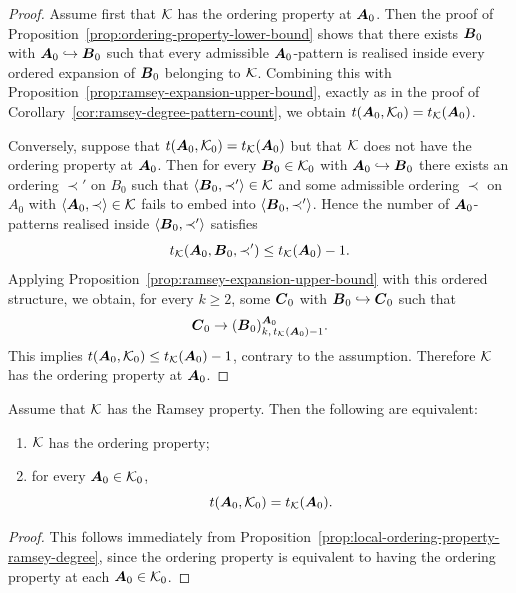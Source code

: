 \begin{proof}
    Assume first that \(\mathcal{K}\) has the ordering property at \(\boldsymbol{A}_0\). Then the proof of Proposition~\ref{prop:ordering-property-lower-bound} shows that there exists \(\boldsymbol{B}_0\) with \(\boldsymbol{A}_0\hookrightarrow\boldsymbol{B}_0\) such that every admissible \(\boldsymbol{A}_0\)-pattern is realised inside every ordered expansion of \(\boldsymbol{B}_0\) belonging to \(\mathcal{K}\). Combining this with Proposition~\ref{prop:ramsey-expansion-upper-bound}, exactly as in the proof of Corollary~\ref{cor:ramsey-degree-pattern-count}, we obtain \(t(\boldsymbol{A}_0,\mathcal{K}_0)=t_{\mathcal{K}}(\boldsymbol{A}_0)\).

    Conversely, suppose that \(t(\boldsymbol{A}_0,\mathcal{K}_0)=t_{\mathcal{K}}(\boldsymbol{A}_0)\)
    but that \(\mathcal{K}\) does not have the ordering property at \(\boldsymbol{A}_0\). Then for every \(\boldsymbol{B}_0\in\mathcal{K}_0\) with \(\boldsymbol{A}_0\hookrightarrow\boldsymbol{B}_0\) there exists an ordering \(\prec'\) on \(B_0\) such that \(\langle\boldsymbol{B}_0,\prec'\rangle\in\mathcal{K}\) and some admissible ordering \(\prec\) on \(A_0\) with \(\langle\boldsymbol{A}_0,\prec\rangle\in\mathcal{K}\)
    fails to embed into \(\langle\boldsymbol{B}_0,\prec'\rangle\). Hence the number of \(\boldsymbol{A}_0\)-patterns realised inside \(\langle\boldsymbol{B}_0,\prec'\rangle\) satisfies
    \[
        t_{\mathcal{K}}(\boldsymbol{A}_0,\boldsymbol{B}_0,\prec')\leq t_{\mathcal{K}}(\boldsymbol{A}_0)-1.
    \]
    Applying Proposition~\ref{prop:ramsey-expansion-upper-bound} with this ordered structure, we obtain, for every \(k\geq 2\), some \(\boldsymbol{C}_0\) with \(\boldsymbol{B}_0\hookrightarrow\boldsymbol{C}_0\) such that
    \[
        \boldsymbol{C}_0\to(\boldsymbol{B}_0)^{\boldsymbol{A}_0}_{k,\,t_{\mathcal{K}}(\boldsymbol{A}_0)-1}.
    \]
    This implies \(t(\boldsymbol{A}_0,\mathcal{K}_0)\leq t_{\mathcal{K}}(\boldsymbol{A}_0)-1\),
    contrary to the assumption. Therefore \(\mathcal{K}\) has the ordering property at \(\boldsymbol{A}_0\).
\end{proof}

\begin{corollary}
    \label{cor:ordering-property-ramsey-degree}
    Assume that \(\mathcal{K}\) has the Ramsey property. Then the following are equivalent:

    \begin{enumerate}
        \item[(i)] \(\mathcal{K}\) has the ordering property;
        \item[(ii)] for every \(\boldsymbol{A}_0\in\mathcal{K}_0\),
              \[
                  t(\boldsymbol{A}_0,\mathcal{K}_0)=t_{\mathcal{K}}(\boldsymbol{A}_0).
              \]
    \end{enumerate}
\end{corollary}

\begin{proof}
    This follows immediately from Proposition~\ref{prop:local-ordering-property-ramsey-degree}, since the ordering property is equivalent to having the ordering property at each \(\boldsymbol{A}_0\in\mathcal{K}_0\).
\end{proof}


